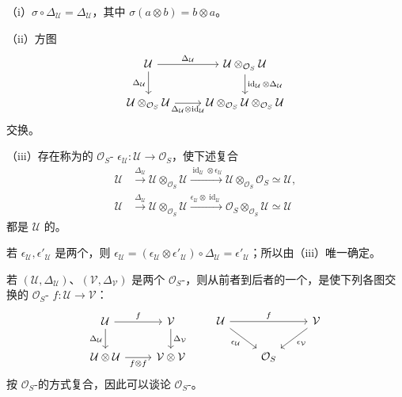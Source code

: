 （i）$\sigma\circ\Delta_{\mathcal U}=\Delta_{\mathcal U}$，其中 $\sigma(a\otimes b)=b\otimes a$。

（ii）方图
\[
\begin{tikzcd}
\mathcal U\arrow[r,"\Delta_{\mathcal U}"]\arrow[d,"\Delta_{\mathcal U}"']&\mathcal U\otimes_{\mathcal O_S}\mathcal U\arrow[d,"\operatorname{id}_{\mathcal U}\otimes\Delta_{\mathcal U}"]\\
\mathcal U\otimes_{\mathcal O_S}\mathcal U\arrow[r,"\Delta_{\mathcal U}\otimes\operatorname{id}_{\mathcal U}"']&\mathcal U\otimes_{\mathcal O_S}\mathcal U\otimes_{\mathcal O_S}\mathcal U
\end{tikzcd}
\]
交换。

（iii）存在称为的 $\mathcal O_S$- $\epsilon_{\mathcal U}:\mathcal U\to\mathcal O_S$，使下述复合
\[
\begin{aligned}
\mathcal U&\xrightarrow{\Delta_{\mathcal U}}\mathcal U\otimes_{\mathcal O_S}\mathcal U\xrightarrow{\operatorname{id}_{\mathcal U}\otimes\epsilon_{\mathcal U}}\mathcal U\otimes_{\mathcal O_S}\mathcal O_S\simeq\mathcal U,\\
\mathcal U&\xrightarrow{\Delta_{\mathcal U}}\mathcal U\otimes_{\mathcal O_S}\mathcal U\xrightarrow{\epsilon_{\mathcal U}\otimes\operatorname{id}_{\mathcal U}}\mathcal O_S\otimes_{\mathcal O_S}\mathcal U\simeq\mathcal U
\end{aligned}
\]
都是 $\mathcal U$ 的。

若 $\epsilon_{\mathcal U},\epsilon'_{\mathcal U}$ 是两个，则 $\epsilon_{\mathcal U}=(\epsilon_{\mathcal U}\otimes\epsilon'_{\mathcal U})\circ\Delta_{\mathcal U}=\epsilon'_{\mathcal U}$；所以由（iii）唯一确定。

若 $(\mathcal U,\Delta_{\mathcal U})$、$(\mathcal V,\Delta_{\mathcal V})$ 是两个 $\mathcal O_S$-，则从前者到后者的一个，是使下列各图交换的 $\mathcal O_S$- $f:\mathcal U\to\mathcal V$：
\[
\begin{tikzcd}
\mathcal U\arrow[r,"f"]\arrow[d,"\Delta_{\mathcal U}"']&\mathcal V\arrow[d,"\Delta_{\mathcal V}"]\\
\mathcal U\otimes\mathcal U\arrow[r,"f\otimes f"']&\mathcal V\otimes\mathcal V
\end{tikzcd}
\qquad
\begin{tikzcd}
\mathcal U\arrow[rr,"f"]\arrow[dr,"\epsilon_{\mathcal U}"']&&\mathcal V\arrow[dl,"\epsilon_{\mathcal V}"]\\
&\mathcal O_S&
\end{tikzcd}
\]
按 $\mathcal O_S$-的方式复合，因此可以谈论 $\mathcal O_S$-。

